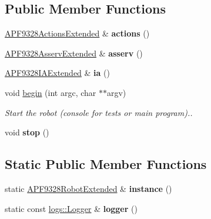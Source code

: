 \subsection*{Public Member Functions}
\begin{DoxyCompactItemize}
\item 
\mbox{\label{classAPF9328RobotExtended_a0405b4cf4e576b41fe9d10c5b7eb9b93}} 
\hyperlink{classAPF9328ActionsExtended}{A\+P\+F9328\+Actions\+Extended} \& {\bfseries actions} ()
\item 
\mbox{\label{classAPF9328RobotExtended_a4a429efc5f8b26728a632980036030ad}} 
\hyperlink{classAPF9328AsservExtended}{A\+P\+F9328\+Asserv\+Extended} \& {\bfseries asserv} ()
\item 
\mbox{\label{classAPF9328RobotExtended_aed343167891f88c2d37f942510d7a713}} 
\hyperlink{classAPF9328IAExtended}{A\+P\+F9328\+I\+A\+Extended} \& {\bfseries ia} ()
\item 
\mbox{\label{classAPF9328RobotExtended_a1162464c895bace8ca05c9dcdbf9c825}} 
void \hyperlink{classAPF9328RobotExtended_a1162464c895bace8ca05c9dcdbf9c825}{begin} (int argc, char $\ast$$\ast$argv)
\begin{DoxyCompactList}\small\item\em Start the robot (console for tests or main program).. \end{DoxyCompactList}\item 
\mbox{\label{classAPF9328RobotExtended_af1cd8698de14c228540fb541b06e1a2d}} 
void {\bfseries stop} ()
\end{DoxyCompactItemize}
\subsection*{Static Public Member Functions}
\begin{DoxyCompactItemize}
\item 
\mbox{\label{classAPF9328RobotExtended_a7b1551cabd76d1d79dc4586ded257cf3}} 
static \hyperlink{classAPF9328RobotExtended}{A\+P\+F9328\+Robot\+Extended} \& {\bfseries instance} ()
\item 
\mbox{\label{classAPF9328RobotExtended_a8a777e69736af425fe37e3777cf15041}} 
static const \hyperlink{classlogs_1_1Logger}{logs\+::\+Logger} \& {\bfseries logger} ()
\end{DoxyCompactItemize}
